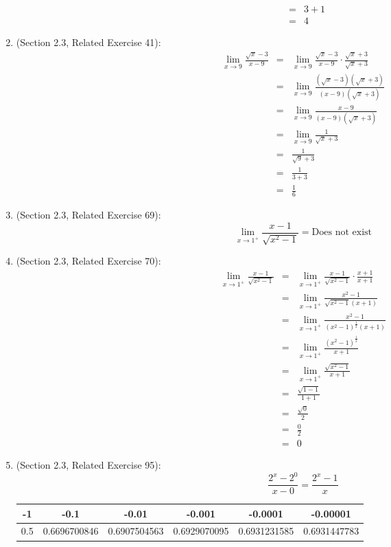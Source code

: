 \documentclass{article}
\begin{document}
\begin{enumerate}
\begin{eqnarray}
	    &=& 3+1 \\
	    &=& 4
	    \end{eqnarray}
    \item (Section 2.3, Related Exercise 41):
	    \begin{eqnarray}
	    \lim_{x \to 9}{\frac{\sqrt{x} - 3}{x - 9}} &=& \lim_{x \to 9}{\frac{\sqrt{x} - 3}{x - 9}} \cdot \frac{\sqrt{x}+3}{\sqrt{x}+3} \\
	    &=& \lim_{x \to 9}{\frac{(\sqrt{x} - 3)(\sqrt{x} + 3)}{(x - 9)(\sqrt{x} + 3)}} \\
	    &=& \lim_{x \to 9}{\frac{x-9}{(x-9)(\sqrt{x}+3)}} \\
	    &=& \lim_{x \to 9}{\frac{1}{\sqrt{x}+3}} \\
	    &=& \frac{1}{\sqrt{9}+3} \\
	    &=& \frac{1}{3+3} \\
	    &=& \frac{1}{6}
	    \end{eqnarray}
    \item (Section 2.3, Related Exercise 69):
	    $$\lim_{x \to 1^+}{\frac{x-1}{\sqrt{x^2-1}}} = \text{Does not exist}$$
    \item (Section 2.3, Related Exercise 70):
	    \begin{eqnarray}
	    \lim_{x \to 1^+}{\frac{x-1}{\sqrt{x^2-1}}} &=& \lim_{x \to 1^+}{\frac{x-1}{\sqrt{x^2-1}} \cdot \frac{x+1}{x+1}} \\
	    &=& \lim_{x \to 1^+}{\frac{x^2-1}{\sqrt{x^2-1} (x+1)}} \\
	    &=& \lim_{x \to 1^+}{\frac{x^2-1}{(x^2-1)^{\frac{1}{2}} (x+1)}} \\
	    &=& \lim_{x \to 1^+}{\frac{(x^2-1)^{\frac{1}{2}}}{x+1}} \\
	    &=& \lim_{x \to 1^+}{\frac{\sqrt{x^2-1}}{x+1}} \\
	    &=& \frac{\sqrt{1-1}}{1+1} \\
	    &=& \frac{\sqrt{0}}{2} \\
	    &=& \frac{0}{2} \\
	    &=& 0
	    \end{eqnarray}
    \item (Section 2.3, Related Exercise 95):
		    $$\frac{2^x - 2^0}{x-0} = \frac{2^x - 1}{x}$$

            \begin{tabular}{| c | c | c | c | c | c |}
                \hline
		        -1 & -0.1 & -0.01 & -0.001 & -0.0001 & -0.00001 \\
                \hline
		        0.5 & 0.6696700846 & 0.6907504563 & 0.6929070095 & 0.6931231585 & 0.6931447783 \\
                \hline
            \end{tabular}


\end{enumerate}
\end{document}
